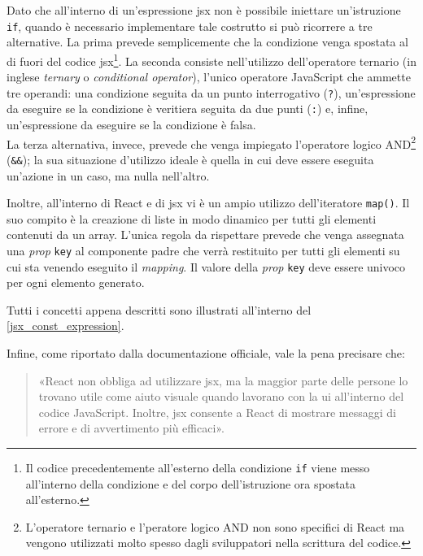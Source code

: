 Dato che all'interno di un'espressione \acrshort{jsx} non è possibile iniettare un'istruzione \texttt{if}, quando è necessario implementare tale costrutto si può ricorrere a tre alternative. La prima prevede semplicemente che la condizione venga spostata al di fuori del codice \acrshort{jsx}\footnote{Il codice precedentemente all'esterno della condizione \texttt{if} viene messo all'interno della condizione e del corpo dell'istruzione ora spostata all'esterno.}. La seconda consiste nell'utilizzo dell'operatore ternario (in inglese \textit{ternary} o \textit{conditional operator}), l'unico operatore JavaScript che ammette tre operandi: una condizione seguita da un punto interrogativo (\texttt{?}), un'espressione da eseguire se la condizione è veritiera seguita da due punti (\texttt{:}) e, infine, un'espressione da eseguire se la condizione è falsa.\\
La terza alternativa, invece, prevede che venga impiegato l'operatore logico AND\footnote{L'operatore ternario e l'peratore logico AND non sono specifici di React ma vengono utilizzati molto spesso dagli sviluppatori nella scrittura del codice.} (\texttt{\&\&}); la sua situazione d'utilizzo ideale è quella in cui deve essere eseguita un'azione in un caso, ma nulla nell'altro.

Inoltre, all'interno di React e di \acrshort{jsx} vi è un ampio utilizzo dell'iteratore \texttt{map()}. Il suo compito è la creazione di liste in modo dinamico per tutti gli elementi contenuti da un array. L'unica regola da rispettare prevede che venga assegnata una \textit{prop} \texttt{key} al componente padre che verrà restituito per tutti gli elementi su cui sta venendo eseguito il \textit{mapping}. Il valore della \textit{prop} \texttt{key} deve essere univoco per ogni elemento generato.

Tutti i concetti appena descritti sono illustrati all'interno del \autoref{jsx_const_expression}.



Infine, come riportato dalla documentazione officiale, vale la pena precisare che: 
\begin{quote}
«React non obbliga ad utilizzare \acrshort{jsx}, ma la maggior parte delle persone lo trovano utile come aiuto visuale quando lavorano con la \acrshort{ui} all’interno del codice JavaScript. Inoltre, \acrshort{jsx} consente a React di mostrare messaggi di errore e di avvertimento più efficaci»\cite{React_IntroduzioneJSX}.
\end{quote}

